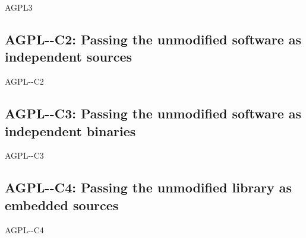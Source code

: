 \begin{license}{AGPL3}
\subsection{AGPL-\ver-C2: Passing the unmodified software as independent sources}
\begin{lsuc}{AGPL-\ver-C2}

  \useCaseTwo

  \begin{lsucrequires}
    \lsucmandatory{\keepLicenseElements}
    \lsucmandatory{\gplthreeEnsureCopyrightNoticeSource}
    \lsucmandatory{\giveLicense}\passingFilesCorrectly
    \lsucmandatory{\retainCopyrightNotices}
    \lsucoptional{\addToDocumentation}
  \end{lsucrequires}

  \begin{lsucprohibits}
    \lsucitem{\noPatentLitigation}
  \end{lsucprohibits}
\end{lsuc}

\subsection{AGPL-\ver-C3: Passing the unmodified software as independent binaries} 
\begin{lsuc}{AGPL-\ver-C3}

  \useCaseThree

  \begin{lsucrequires}
    \lsucmandatory{\keepLicenseElements}
    \lsucmandatory{\gplthreeEnsureCopyrightNoticeBinary}
    \lsucmandatory{\giveLicense}\passingFilesCorrectly  
    \lsucmandatory{\makeUnmodifiedSourceAvailable}
    \lsucmandatory{\describeHowToGetSource}
    \lsucmandatory{\retainCopyrightNotices}
    \lsucoptional{\addToDocumentation}
  \end{lsucrequires}

  \begin{lsucprohibits}
    \lsucitem{\noPatentLitigation}
  \end{lsucprohibits}
\end{lsuc}

\subsection{AGPL-\ver-C4: Passing the unmodified library as embedded sources}
\begin{lsuc}{AGPL-\ver-C4}


\end{lsuc}
\end{license}
